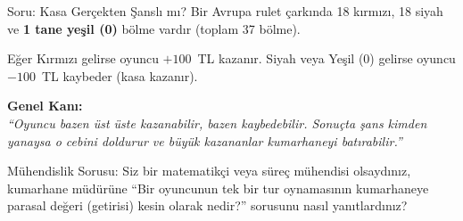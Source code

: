 \documentclass[light]{lutbeamer}
\begin{document}
\begin{frame}{Soru: Kasa Gerçekten Şanslı mı?}
    \justifying{}
    Bir Avrupa rulet çarkında 18 kırmızı, 18 siyah ve \textbf{1 tane yeşil (0)} bölme vardır (toplam 37 bölme).

    \vspace{1em}
    Eğer Kırmızı gelirse oyuncu $+100$~TL kazanır. Siyah veya Yeşil (0) gelirse oyuncu $-100$~TL kaybeder (kasa kazanır).
    
    \vspace{1em}
    \textbf{Genel Kanı:} \\
    \textit{``Oyuncu bazen üst üste kazanabilir, bazen kaybedebilir. Sonuçta şans kimden yanaysa o cebini doldurur ve büyük kazananlar kumarhaneyi batırabilir.''}

    \vspace{1.5em}
    \begin{exampleblock}{Mühendislik Sorusu:}
        Siz bir matematikçi veya süreç mühendisi olsaydınız, kumarhane müdürüne ``Bir oyuncunun tek bir tur oynamasının kumarhaneye parasal değeri (getirisi) kesin olarak nedir?'' sorusunu nasıl yanıtlardınız?
    \end{exampleblock}
\end{frame}
\end{document}
